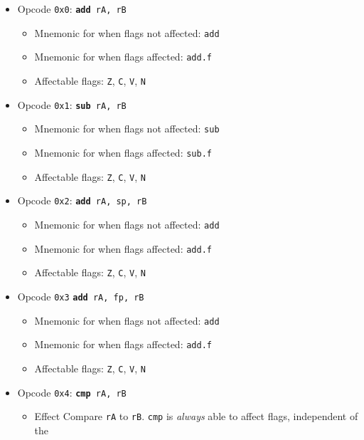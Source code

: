 \documentclass{article}
\begin{document}
	\singlespacing
	\begin{itemize}
	\item Opcode \texttt{0x0}:
		\texttt{\textbf{add} rA, rB}
		\begin{itemize}
		\item Mnemonic for when flags not affected: \texttt{add}
		\item Mnemonic for when flags affected: \texttt{add.f}
		\item Affectable flags:
			\texttt{Z}, \texttt{C}, \texttt{V}, \texttt{N}
		\end{itemize}
	\item Opcode \texttt{0x1}:
		\texttt{\textbf{sub} rA, rB}
		\begin{itemize}
		\item Mnemonic for when flags not affected: \texttt{sub}
		\item Mnemonic for when flags affected: \texttt{sub.f}
		\item Affectable flags:
			\texttt{Z}, \texttt{C}, \texttt{V}, \texttt{N}
		\end{itemize}
	\item Opcode \texttt{0x2}:
		\texttt{\textbf{add} rA, sp, rB}
		\begin{itemize}
		\item Mnemonic for when flags not affected: \texttt{add}
		\item Mnemonic for when flags affected: \texttt{add.f}
		\item Affectable flags:
			\texttt{Z}, \texttt{C}, \texttt{V}, \texttt{N}
		\end{itemize}
	\item Opcode \texttt{0x3}
		\texttt{\textbf{add} rA, fp, rB}
		\begin{itemize}
		\item Mnemonic for when flags not affected: \texttt{add}
		\item Mnemonic for when flags affected: \texttt{add.f}
		\item Affectable flags:
			\texttt{Z}, \texttt{C}, \texttt{V}, \texttt{N}
		\end{itemize}
	\item Opcode \texttt{0x4}:
		\texttt{\textbf{cmp} rA, rB}
		\begin{itemize}
		\item Effect Compare \texttt{rA} to \texttt{rB}. \texttt{cmp}
		is \textit{always} able to affect flags, independent of the

\end{itemize}
\end{itemize}
\end{document}
